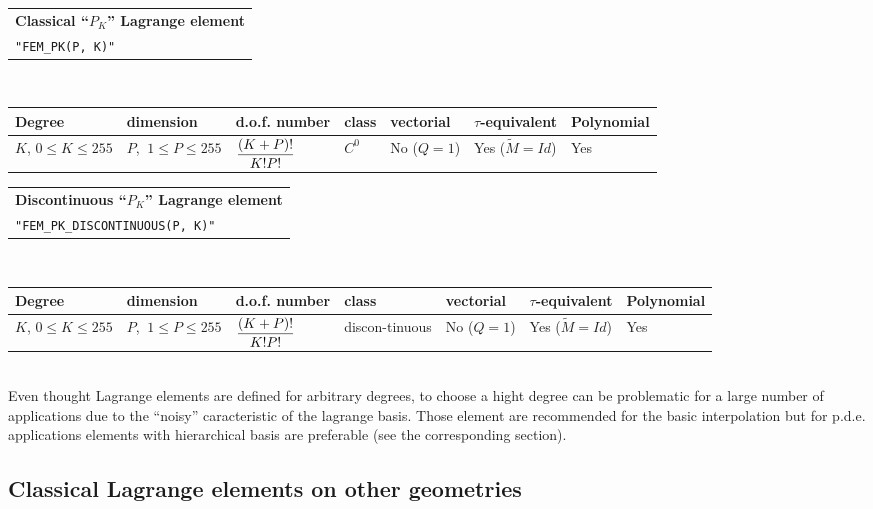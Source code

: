 \documentclass[10pt,a4paper]{article}
\begin{document}
\begin{center}
\begin{tabular}{|m{16.109cm}|} \hline
{\bf Classical ``$P_K$'' Lagrange element}\\
{\tt "FEM\_PK(P, K)"} 
\end{tabular} \\ \vspace{-1pt} 
\begin{tabular}{|m{2cm}|m{2cm}|m{2.5cm}|m{1.5cm}|m{1.5cm}|m{2cm}|m{2cm}|} \hline 
Degree & dimension & d.o.f. number & class & vectorial & \mbox{$\tau$-equivalent} & Polynomial \\ \hline
\small $K$, \mbox{$0 \leq K \leq 255$} & \small $P$, \mbox{$\ 1 \leq P \leq 255$} & ${\displaystyle \frac{\displaystyle (K+P)!}{\displaystyle K! P!}}$ & $C^0$ & No \mbox{($Q = 1$)} & Yes \mbox{($\tilde{M} = Id$)} & Yes \\ \hline
\end{tabular}
\end{center}
\begin{center}
\begin{tabular}{|m{16.109cm}|} \hline 
{\bf Discontinuous ``$P_K$'' Lagrange element}\\
{\tt "FEM\_PK\_DISCONTINUOUS(P, K)"} 
\end{tabular} \\ \vspace{-1pt} 
\begin{tabular}{|m{2cm}|m{2cm}|m{2.5cm}|m{1.5cm}|m{1.5cm}|m{2cm}|m{2cm}|} \hline 
Degree & dimension & d.o.f. number & class & vectorial & \mbox{$\tau$-equivalent} & Polynomial \\ \hline
\small $K$, \mbox{$0 \leq K \leq 255$} & \small $P$, \mbox{$\ 1 \leq P \leq 255$} & ${\displaystyle \frac{\displaystyle (K+P)!}{\displaystyle K! P!}}$ & discon-tinuous & No \mbox{($Q = 1$)} & Yes \mbox{($\tilde{M} = Id$)} & Yes \\ \hline
\end{tabular}
\end{center}$\ $\\[3cm]

Even thought Lagrange elements are defined for arbitrary degrees, to choose a hight degree can be problematic for a large number of applications due to the ``noisy'' caracteristic of the lagrange basis. Those element are recommended for the basic interpolation but for p.d.e. applications elements with hierarchical basis are preferable (see the corresponding section).

\subsection{Classical Lagrange elements on other geometries}
\end{document}
